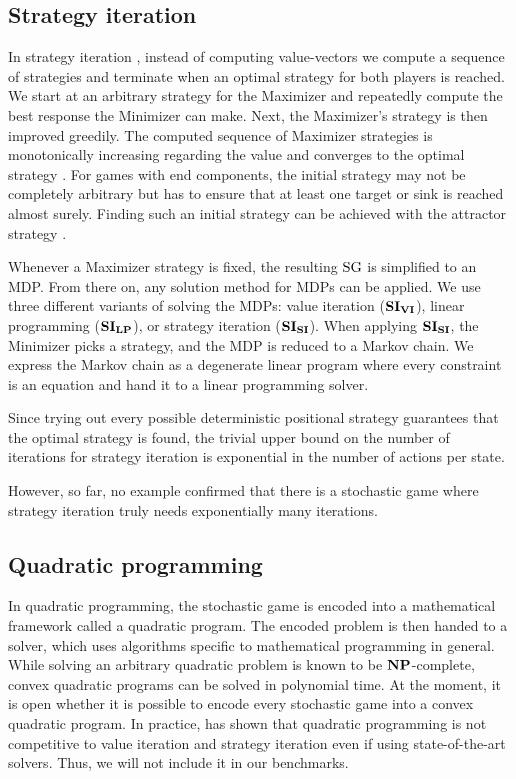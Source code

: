 \subsection{Strategy iteration}
In strategy iteration \cite{HoffmanKarp}\cite{condonQP}, instead of computing value-vectors we compute a sequence of strategies and terminate when an optimal strategy for both players is reached.
We start at an arbitrary strategy for the Maximizer and repeatedly compute the best response the Minimizer can make. Next, the Maximizer's strategy is then improved greedily.
The computed sequence of Maximizer strategies is monotonically increasing regarding the value and converges to the optimal strategy \cite[Theorem3]{correctnessSI}.
For games with end components, the initial strategy may not be completely arbitrary but has to ensure that at least one target or sink is reached almost surely.
Finding such an initial strategy can be achieved with the attractor strategy \cite[Section 5.3]{correctnessSI}.

Whenever a Maximizer strategy is fixed, the resulting $\textrm{SG}$ is simplified to an MDP. 
From there on, any solution method for MDPs can be applied.
We use three different variants of solving the MDPs: value iteration ($\mathbf{SI_{VI}}$), linear programming \cite{Puterman} ($\mathbf{SI_{LP}}$),
or strategy iteration ($\mathbf{SI_{SI}}$). When applying $\mathbf{SI_{SI}}$, the Minimizer picks a strategy, and the MDP is reduced to a Markov chain.
We express the Markov chain as a degenerate linear program where every constraint is an equation and hand it to a linear programming solver. 

Since trying out every possible deterministic positional strategy guarantees that the optimal strategy is found,
the trivial upper bound on the number of iterations for strategy iteration is exponential in the number of actions per state.

However, so far, no example confirmed that there is a stochastic game where strategy iteration truly needs exponentially many iterations.

\subsection{Quadratic programming}
In quadratic programming, the stochastic game is encoded into a mathematical framework called a quadratic program. 
The encoded problem is then handed to a solver, which uses algorithms specific to mathematical programming in general.
While solving an arbitrary quadratic problem is known to be $\mathbf{NP}$-complete, convex quadratic programs can be solved in polynomial time.
At the moment, it is open whether it is possible to encode every stochastic game into a convex quadratic program.
In practice, \cite{gandalf} has shown that quadratic programming is not competitive to value iteration and strategy iteration even if using 
state-of-the-art solvers. Thus, we will not include it in our benchmarks.

